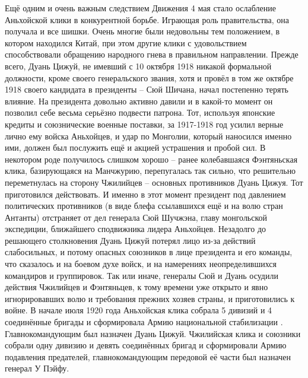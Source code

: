 Ещё одним и очень важным следствием Движения 4 мая стало ослабление Аньхойской клики в конкурентной борьбе. Играющая роль правительства, она получала и все шишки. Очень многие были недовольны тем положением, в котором находился Китай, при этом другие клики с удовольствием способствовали обращению народного гнева в правильном направлении. Прежде всего, Дуань Цижуй, не имевший с 10 октября 1918 никакой формальной должности, кроме своего генеральского звания, хотя и провёл в том же октябре 1918 своего кандидата в президенты – Сюй Шичана, начал постепенно терять влияние. На президента довольно активно давили и в какой-то момент он позволил себе весьма серьёзно подвести патрона. Тот, используя японские кредиты и союзнические военные поставки, за 1917-1918 год усилил верные лично ему войска Аньхойцев, и удар по Монголии, который наносился именно ими, должен был послужить ещё и акцией устрашения и пробой сил. В некотором роде получилось слишком хорошо – ранее колебавшаяся Фэнтяньская клика, базирующаяся на Манчжурию, перепугалась так сильно, что решительно переметнулась на сторону Чжилийцев – основных противников Дуань Цижуя. Тот приготовился действовать. И именно в этот момент президент под давлением политических противников (в виде блефа ссылавшихся ещё и на волю стран Антанты) отстраняет от дел генерала Сюй Шучжэна, главу монгольской экспедиции, ближайшего сподвижника лидера Аньхойцев. Незадолго до решающего столкновения Дуань Цижуй потерял лицо из-за действий слабосильных, и потому опасных союзников в лице президента и его команды, что сказалось и на боевом духе войск, и на намерениях неопределившихся командиров и группировок. Так или иначе, генералы Сюй и Дуань осудили действия Чжилийцев и Фэнтяньцев, к тому времени уже открыто и явно игнорировавших волю и требования прежних хозяев страны, и приготовились к войне. В начале июля 1920 года Аньхойская клика собрала 5 дивизий и 4 соединённые бригады и сформировала Армию национальной стабилизации . Главнокомандующим был назначен Дуань Цижуй. Чжилийская клика и союзники собрали одну дивизию и девять соединённых бригад и сформировали Армию подавления предателей, главнокомандующим передовой её части был назначен генерал У Пэйфу. 

